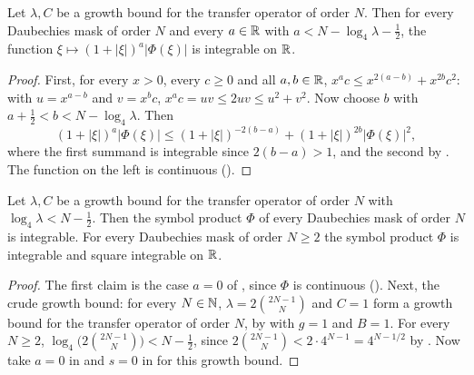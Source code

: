 \begin{corollary}
\label{cor:daub-decay-l1}
\leanok
{}
Let $\lambda, C$ be a growth bound for the transfer operator of order $N$. Then for every
Daubechies mask of order $N$ and every $a \in \mathbb{R}$ with $a < N - \log_4 \lambda - \frac12$, the
function $\xi \mapsto (1 + |\xi|)^a |\Phi(\xi)|$ is integrable on $\mathbb{R}$.
\end{corollary}

\begin{proof}
\leanok
{}
First, for every $x > 0$, every $c \geq 0$ and all $a, b \in \mathbb{R}$,
$x^a c \leq x^{2(a-b)} + x^{2b} c^2$: with $u = x^{a-b}$ and $v = x^b c$,
$x^a c = uv \leq 2uv \leq u^2 + v^2$. Now choose $b$ with $a + \frac12 < b < N - \log_4 \lambda$.
Then
\[
  (1 + |\xi|)^a |\Phi(\xi)| \leq (1 + |\xi|)^{-2(b - a)} + (1 + |\xi|)^{2b} |\Phi(\xi)|^2 ,
\]
where the first summand is integrable since $2(b - a) > 1$, and the second by
. The function on the left is continuous
().
\end{proof}

\begin{proposition}
\label{prop:daub-symbol-product-integrable}
\leanok
{}
Let $\lambda, C$ be a growth bound for the transfer operator of order $N$ with
$\log_4 \lambda < N - \frac12$. Then the symbol product $\Phi$ of every Daubechies mask of order
$N$ is integrable. For every Daubechies mask of order $N \geq 2$ the symbol product $\Phi$ is
integrable and square integrable on $\mathbb{R}$.
\end{proposition}

\begin{proof}
\leanok
{}
The first claim is the case $a = 0$ of , since $\Phi$ is continuous
(). Next, the crude growth bound:
for every $N \in \mathbb{N}$, $\lambda = 2 \binom{2N-1}{N}$ and $C = 1$ form a growth bound for the
transfer operator of order $N$, by  with $g = 1$ and $B = 1$.
For every $N \geq 2$, $\log_4 \bigl(2 \binom{2N-1}{N}\bigr) < N - \frac12$, since
$2 \binom{2N-1}{N} < 2 \cdot 4^{N-1} = 4^{N - 1/2}$ by . Now take
$a = 0$ in  and $s = 0$ in  for this growth
bound.
\end{proof}

